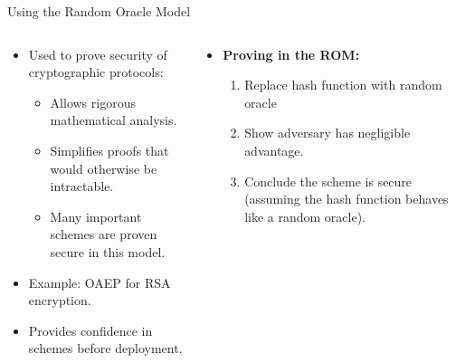 \documentclass[aspectratio=169, lualatex, handout]{beamer}
\begin{document}
\begin{frame}{Using the Random Oracle Model}
	\begin{columns}[c]
		\begin{column}{0.5\textwidth}
			\begin{itemize}
				\item Used to prove security of cryptographic protocols:
				      \begin{itemize}
					      \item Allows rigorous mathematical analysis.
					      \item Simplifies proofs that would otherwise be intractable.
					      \item Many important schemes are proven secure in this model.
				      \end{itemize}
				\item Example: OAEP for RSA encryption.
				\item Provides confidence in schemes before deployment.
			\end{itemize}
		\end{column}
		\begin{column}{0.5\textwidth}
			\begin{itemize}
				\item \textbf{Proving in the ROM:}
				      \begin{enumerate}
					      \item Replace hash function with random oracle
					      \item Show adversary has negligible advantage.
					      \item Conclude the scheme is secure (assuming the hash function behaves like a random oracle).
				      \end{enumerate}
			\end{itemize}
		\end{column}
	\end{columns}
\end{frame}
\end{document}
